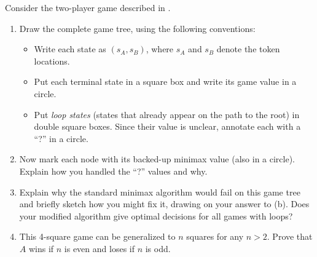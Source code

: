 \begin{exercise}
Consider the two-player game described in .
\begin{enumerate}
\item Draw the complete game tree, using the following conventions:
\begin{itemize}
\item Write each state as \((s_A,s_B)\), where \(s_A\) and \(s_B\) denote the token locations. 
\item Put each terminal state in a square box and write its game value in a circle.
\item Put {\em loop states} (states that already appear on the path to the root) in double square boxes.
Since their value is unclear, annotate
each with a ``?'' in a circle.
\end{itemize}
\item Now mark each node with its backed-up minimax value (also in
a circle). Explain how you handled the ``?'' values and why.
\item Explain why the standard minimax algorithm would fail on this game tree
and briefly sketch how you might fix it, drawing on your answer to
(b). Does your modified algorithm give optimal decisions for all games with loops?
\item This 4-square game can be generalized to \(n\) squares for any \(n > 2\).
Prove that \(A\) wins if \(n\) is even and loses if \(n\) is odd.
\end{enumerate}
\end{exercise} 



